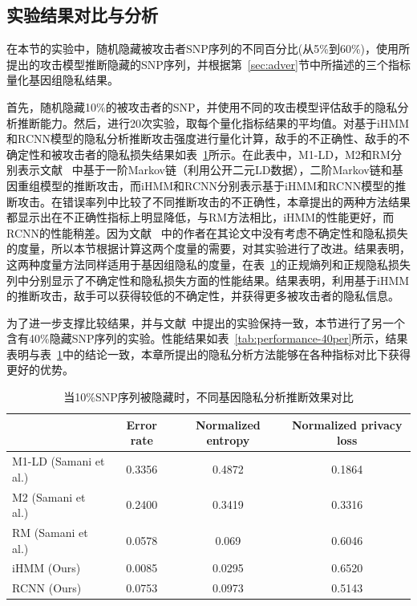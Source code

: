 \subsection{实验结果对比与分析}

在本节的实验中，随机隐藏被攻击者SNP序列的不同百分比(从5\%到60\%)，使用所提出的攻击模型推断隐藏的SNP序列，并根据第~\ref{sec:adver}节中所描述的三个指标量化基因组隐私结果。

首先，随机隐藏10\%的被攻击者的SNP，并使用不同的攻击模型评估敌手的隐私分析推断能力。然后，进行20次实验，取每个量化指标结果的平均值。对基于iHMM和RCNN模型的隐私分析推断攻击强度进行量化计算，敌手的不正确性、敌手的不确定性和被攻击者的隐私损失结果如表~\ref{tab:performance-10per}所示。在此表中，M1-LD，M2和RM分别表示文献~\cite{samani2015quantifying} 中基于一阶Markov链（利用公开二元LD数据），二阶Markov链和基因重组模型的推断攻击，而iHMM和RCNN分别表示基于iHMM和RCNN模型的推断攻击。在错误率列中比较了不同推断攻击的不正确性，本章提出的两种方法结果都显示出在不正确性指标上明显降低，与RM方法相比，iHMM的性能更好，而RCNN的性能稍差。因为文献~\cite{samani2015quantifying} 中的作者在其论文中没有考虑不确定性和隐私损失的度量，所以本节根据计算这两个度量的需要，对其实验进行了改进。结果表明，这两种度量方法同样适用于基因组隐私的度量，在表~\ref{tab:performance-10per}的正规熵列和正规隐私损失列中分别显示了不确定性和隐私损失方面的性能结果。结果表明，利用基于iHMM的推断攻击，敌手可以获得较低的不确定性，并获得更多被攻击者的隐私信息。

为了进一步支撑比较结果，并与文献~\cite{samani2015quantifying}中提出的实验保持一致，本节进行了另一个含有40\%隐藏SNP序列的实验。性能结果如表~\ref{tab:performance-40per}所示，结果表明与表~\ref{tab:performance-10per}中的结论一致，本章所提出的隐私分析方法能够在各种指标对比下获得更好的优势。

\begin{table}[htbp]
	\caption{当10\%SNP序列被隐藏时，不同基因隐私分析推断效果对比}
	\label{tab:performance-10per}
	\begin{tabular}{lccc}
		\hline
		& Error rate & Normalized entropy & Normalized privacy loss\\
		\hline
		M1-LD (Samani et al.) & 0.3356  & 0.4872 & 0.1864 \\
		M2 (Samani et al.)    & 0.2400  & 0.3419 & 0.3316\\
		RM (Samani et al.)    &  0.0578 & 0.069 & 0.6046 \\
		iHMM (Ours)          & 0.0085  &0.0295 & 0.6520 \\
		RCNN (Ours)          & 0.0753  &0.0973 & 0.5143\\
		\hline
	\end{tabular}
\end{table}


